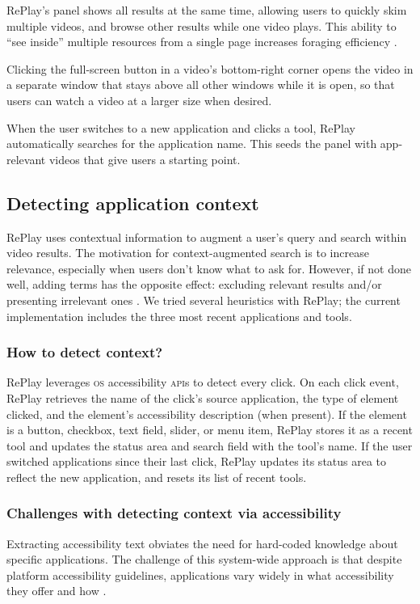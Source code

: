 RePlay's panel shows all results at the same time, allowing users to quickly skim multiple videos, and browse other results while one video plays. This ability to ``see inside'' multiple resources from a single page increases foraging efficiency \cite{Vermette2017, Glassman2016, Pavel2013}. 

Clicking the full-screen button in a video's bottom-right corner opens the video in a separate window that stays above all other windows while it is open, so that users can watch a video at a larger size when desired.

When the user switches to a new application and clicks a tool, RePlay automatically searches for the application name. This seeds the panel with app-relevant videos that give users a starting point.

\subsection{Detecting application context}
RePlay uses contextual information to augment a user's query and search within video results. The motivation for context-augmented search is to increase relevance, especially when users don't know what to ask for. However, if not done well, adding terms has the opposite effect: excluding relevant results and/or presenting irrelevant ones \cite{Finkelstein2002}. We tried several heuristics with RePlay; the current implementation includes the three most recent applications and tools.

\subsubsection{How to detect context?}
RePlay leverages \textsc{os} accessibility \textsc{api}s to detect every click. On each click event, RePlay retrieves the name of the click's source application, the type of element clicked, and the element's accessibility description (when present). If the element is a button, checkbox, text field, slider, or menu item, RePlay stores it as a recent tool and updates the status area and search field with the tool's name. If the user switched applications since their last click, RePlay updates its status area to reflect the new application, and resets its list of recent tools.

\subsubsection{Challenges with detecting context via accessibility}
Extracting accessibility text obviates the need for hard-coded knowledge about specific applications. The challenge of this system-wide approach is that despite platform accessibility guidelines, applications vary widely in what accessibility they offer and how \cite{Hurst2010}.


